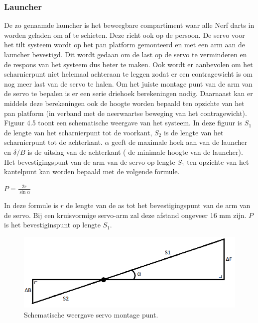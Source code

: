 \begin{cppcode}
\begin{cppcode}
\subsubsection{Launcher}
\label{subsub:launcher}
De zo genaamde launcher is het beweegbare compartiment waar alle Nerf darts in worden geladen
om af te schieten. Deze richt ook op de persoon.
De servo voor het tilt systeem wordt op het pan platform gemonteerd en met een arm aan de
launcher bevestigd. Dit wordt gedaan om de last op de servo te verminderen en de respons van
het systeem dus beter te maken. Ook wordt er aanbevolen om het scharnierpunt niet helemaal
achteraan te leggen zodat er een contragewicht is om nog meer last van de servo te halen.
Om het juiste montage punt van de arm van de servo te bepalen is er een serie driehoek berekeningen
nodig. Daarnaast kan er middels deze berekeningen ook de hoogte worden bepaald ten
opzichte van het pan platform (in verband met de neerwaartse beweging van het contragewicht).
Figuur 4.5 toont een schematische weergave van het systeem. In deze figuur is $S_1$ de lengte van
het scharnierpunt tot de voorkant, $S_2$ is de lengte van het scharnierpunt tot de achterkant. $\alpha$ geeft
de maximale hoek aan van de launcher en $\delta/B$ is de uitslag van de achterkant ( de minimale hoogte
van de launcher).
Het bevestigingspunt van de arm van de servo op lengte $S_1$ ten opzichte van het kantelpunt kan
worden bepaald met de volgende formule.

$P = \frac{2r}{\sin\alpha}$

In deze formule is $r$ de lengte van de as tot het bevestigingspunt van de arm van de servo. Bij een
kruisvormige servo-arm zal deze afstand ongeveer 16 mm zijn. $P$ is het bevestiginspunt op lengte
$S_1$.

\begin{figure}
    \begin{center}
        \includegraphics[scale=0.5]{figures/kantelpunt_launcher.png}
    \end{center}
    \caption{Schematische weergave servo montage punt.}
    \label{fig:berrLauncher}
\end{figure}


\end{cppcode}
\end{cppcode}
